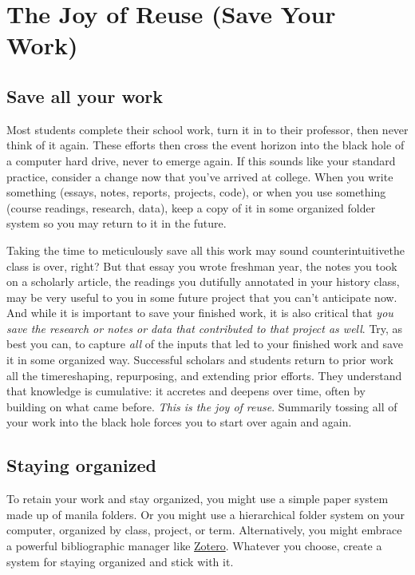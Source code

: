 
\hypertarget{joyofreuse}{}

\chapter{The Joy of Reuse (Save Your Work)}


\section{Save all your work}

Most students complete their school work, turn it in to their professor, then never think of it again. These efforts then cross the event horizon into the black hole of a computer hard drive, never to emerge again. If this sounds like your standard practice, consider a change now that you've arrived at college. When you write something (essays, notes, reports, projects, code), or when you use something (course readings, research, data), keep a copy of it in some organized folder system so you may return to it in the future. 

Taking the time to meticulously save all this work may sound counterintuitive\textemdash the class is over, right? But that essay you wrote freshman year, the notes you took on a scholarly article, the readings you dutifully annotated in your history class, may be very useful to you in some future project that you can't anticipate now. And while it is important to save your finished work, it is also critical that \emph{you save the research or notes or data that contributed to that project as well}. Try, as best you can, to capture \emph{all} of the inputs that led to your finished work and save it in some organized way. Successful scholars and students return to prior work all the time\textemdash reshaping, repurposing, and extending prior efforts. They understand that knowledge is cumulative: it accretes and deepens over time, often by building on what came before. \emph{This is the joy of reuse}. Summarily tossing all of your work into the black hole forces you to start over again and again. 

\section{Staying organized}

To retain your work and stay organized, you might use a simple paper system made up of manila folders. Or you might use a hierarchical folder system on your computer, organized by class, project, or term. Alternatively, you might embrace a powerful bibliographic manager like \href{www.zotero.org}{Zotero}. Whatever you choose, create a system for staying organized and stick with it. 

